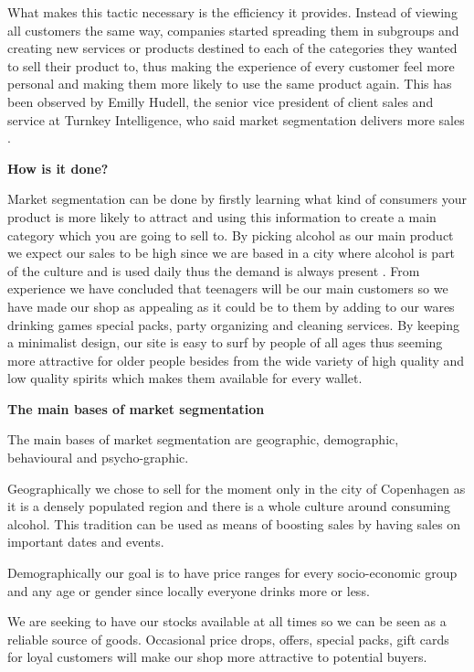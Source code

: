 \documentclass[12p]{article}
\begin{document}
What makes this tactic necessary is the efficiency it provides. Instead of viewing all customers the same way, companies started spreading them in subgroups and creating new services or products destined to each of the categories they wanted to sell their product to, thus making the experience of every customer feel more personal and making them more likely to use the same product again. This has been observed by Emilly Hudell, the senior vice president of client sales and service at Turnkey Intelligence, who said market segmentation delivers more sales \cite{MarketSegmentationEfficieny}.

\textbf{How is it done?}

Market segmentation can be done by firstly learning what kind of consumers your product is more likely to attract and using this information to create a main category which you are going to sell to. By picking alcohol as our main product we expect our sales to be high since we are based in a city where alcohol is part of the culture and is used daily thus the demand is always present \cite{DanesBinge}. From experience we have concluded that teenagers will be our main customers so we have made our shop as appealing as it could be to them by adding to our wares drinking games special packs, party organizing and cleaning services. By keeping a minimalist design, our site is easy to surf by people of all ages thus seeming more attractive for older people besides from the wide variety of high quality and low quality spirits which makes them available for every wallet.

\textbf{The main bases of market segmentation}

The main bases of market segmentation are geographic, demographic, behavioural and psycho-graphic. 

Geographically we chose to sell for the moment only in the city of Copenhagen as it is a densely populated region and there is a whole culture around consuming alcohol. This tradition can be used as means of boosting sales by having sales on important dates and events.

Demographically our goal is to have price ranges for every socio-economic group and any age or gender since locally everyone drinks more or less.

We are seeking to have our stocks available at all times so we can be seen as a reliable source of goods. Occasional price drops, offers, special packs, gift cards for loyal customers will make our shop more attractive to potential buyers.
\end{document}
